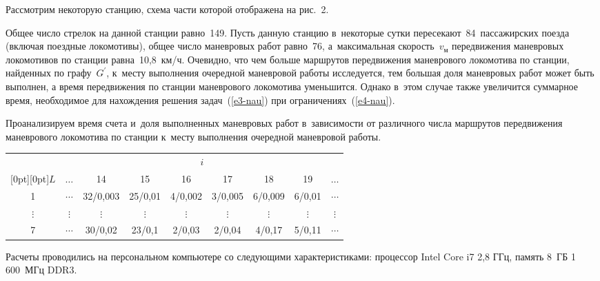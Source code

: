 \begin{multicols}{2}
Рассмотрим некоторую станцию, схема части которой отображена на рис.~2.

 Общее число стрелок на данной станции равно~149. Пусть данную 
станцию в~некоторые сутки пересекают~84~пассажирских поезда (включая 
поездные локомотивы), общее число маневровых работ равно~76, а~максимальная 
скорость~$v_{\mathrm{м}}$ передвижения маневровых локомотивов по станции 
равна~10,8~км/ч. Очевидно, что чем больше маршрутов передвижения 
маневрового локомотива по станции, найденных по графу~$G^\prime$, к~месту 
выполнения очередной маневровой работы исследуется, тем большая доля 
маневровых работ может быть выполнен, а время передвижения по станции 
маневрового локомотива уменьшится. Однако в~этом случае также увеличится 
суммарное время, необходимое для нахождения решения задач~(\ref{e3-nau}) при 
ограничениях~(\ref{e4-nau}). 

Проанализируем время счета и~доля выполненных 
маневровых работ в~зависимости от различного числа маршрутов передвижения 
маневрового локомотива по станции к~месту выполнения очередной маневровой 
работы.
      
\begin{table*}\small %
 \begin{center}
 \parbox{320pt}{

}

\vspace*{2ex}
       
\begin{tabular}{|c|c|c|c|c|c|c|c|c|}
\hline
&\multicolumn{8}{c|}{$i$}\\
\cline{2-9}
\raisebox{6pt}[0pt][0pt]{$L$}&$\ldots$&14&15&16&17&18&19&$\ldots$\\
\hline
1&$\cdots$&32/0,003&25/0,01&4/0,002&3/0,005&6/0,009&6/0,01&$\cdots$\\
$\vdots$&$\vdots$&$\vdots$&$\vdots$&$\vdots$&$\vdots$&$\vdots$&$\vdots$&$\vdots$\\
7&$\cdots$&30/0,02&23/0,1&2/0,03&2/0,04&4/0,17&5/0,11&$\cdots$\\
\hline
\end{tabular}
\end{center}
\end{table*}
      
Расчеты проводились на персональном компьютере со следующими характеристиками: 
процессор Intel Core i7 2,8 ГГц, память 8~ГБ 1\,600~МГц DDR3.
      

\end{multicols}

